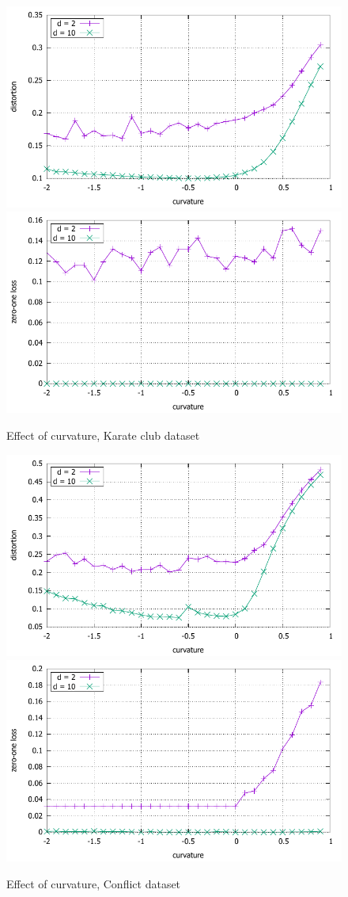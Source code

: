 \documentclass{article} %
\begin{document}
\begin{figure}
    \centering
    \includegraphics[width = 0.49 \textwidth]{karate_distortion.pdf}
    \includegraphics[width = 0.49 \textwidth]{karate_zero_one.pdf}
    \caption{Effect of curvature, Karate club dataset}
    \label{fig:karate}
\end{figure}

\begin{figure}
    \centering
    \includegraphics[width = 0.49 \textwidth]{conflict_distortion.pdf}
    \includegraphics[width = 0.49 \textwidth]{conflict_zero_one.pdf}
    \caption{Effect of curvature, Conflict dataset}
    \label{fig:conflict}
\end{figure}
\end{document}
